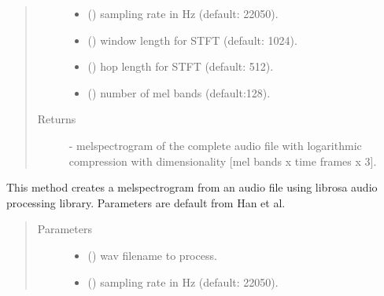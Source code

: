 \documentclass[letterpaper,10pt,english]{sphinxmanual}
\begin{document}
\begin{fulllineitems}
\begin{fulllineitems}
\begin{quote}
\begin{description}
\begin{itemize}
\item {} 
 () \textendash{} sampling rate in Hz (default: 22050).

\item {} 
 () \textendash{} window length for STFT (default: 1024).

\item {} 
 () \textendash{} hop length for STFT (default: 512).

\item {} 
 () \textendash{} number of mel bands (default:128).

\end{itemize}

\item[{Returns}] \leavevmode
{}  - melspectrogram of the complete audio file with logarithmic compression with dimensionality {[}mel bands x time frames x 3{]}.

\end{description}\end{quote}

\end{fulllineitems}


\begin{fulllineitems}
\label{\detokenize{generate_dataset:generate_dataset.GenerateDataset.create_spectrogram}}
This method creates a melspectrogram from an audio file using librosa
audio processing library. Parameters are default from Han et al.
\begin{quote}\begin{description}
\item[{Parameters}] \leavevmode\begin{itemize}
\item {} 
 () \textendash{} wav filename to process.

\item {} 
 () \textendash{} sampling rate in Hz (default: 22050).


\end{itemize}
\end{description}
\end{quote}
\end{fulllineitems}
\end{fulllineitems}
\end{document}
